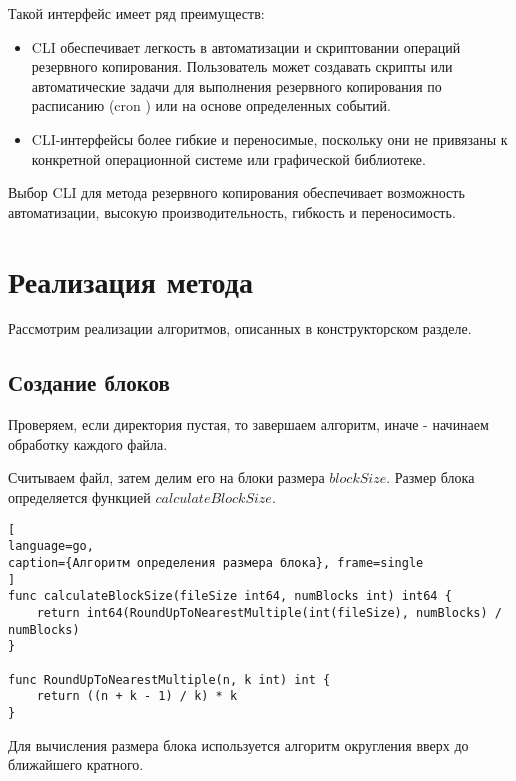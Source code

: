 \begin{flushleft}
Такой интерфейс имеет ряд преимуществ:
\end{flushleft}

\begin{itemize}[label=\textbullet]
\item CLI обеспечивает легкость в автоматизации и скриптовании операций резервного копирования. Пользователь может создавать скрипты или автоматические задачи для выполнения резервного копирования по расписанию (cron \cite{cron}) или на основе определенных событий.

\item CLI-интерфейсы более гибкие и переносимые, поскольку они не привязаны к конкретной операционной системе или графической библиотеке.

\end{itemize}

Выбор CLI для метода резервного копирования обеспечивает возможность автоматизации, высокую производительность, гибкость и переносимость.
\newpage

\section{Реализация метода}

Рассмотрим реализации алгоритмов, описанных в конструкторском разделе. 

\subsection{Создание блоков}
Проверяем, если директория пустая, то завершаем алгоритм, иначе - начинаем обработку каждого файла.  

\newpage

Считываем файл, затем делим его на блоки размера $blockSize$. 
Размер блока определяется функцией $calculateBlockSize$.  
\begin{lstlisting}[
language=go, 
caption={Алгоритм определения размера блока}, frame=single
]
func calculateBlockSize(fileSize int64, numBlocks int) int64 {
	return int64(RoundUpToNearestMultiple(int(fileSize), numBlocks) / numBlocks)
}

func RoundUpToNearestMultiple(n, k int) int {
	return ((n + k - 1) / k) * k
}
\end{lstlisting}

Для вычисления размера блока используется алгоритм округления вверх до ближайшего кратного.

